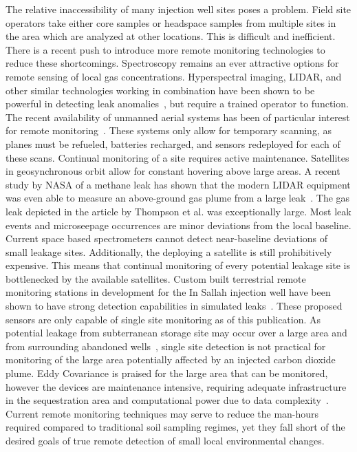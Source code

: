 \documentclass[numbook, envcountsect, envcountsame, envcountreset, runningheads, twocolumn]{svjour3}
\begin{document}
			The relative inaccessibility of many injection well sites poses a problem.  Field site operators take either core samples or headspace samples from multiple sites in the area which are analyzed at other locations. This is difficult and inefficient.  There is a recent push to introduce more remote monitoring technologies to reduce these shortcomings.  Spectroscopy remains an ever attractive options for remote sensing of local gas concentrations.  Hyperspectral imaging, LIDAR, and other similar technologies working in combination have been shown to be powerful in detecting leak anomalies~\cite{bateson_application_2008, male_using_2009}, but require a trained operator to function.  The recent availability of unmanned aerial systems has been of particular interest for remote monitoring~\cite{salami_uav_2014}.  These systems only allow for temporary scanning, as planes must be refueled, batteries recharged, and sensors redeployed for each of these scans.  Continual monitoring of a site requires active maintenance.  Satellites in geosynchronous orbit allow for constant hovering above large areas.  A recent study by NASA of a methane leak has shown that the modern LIDAR equipment was even able to measure an above-ground gas plume from a large leak~\cite{thompson_space-based_2016}.  The gas leak depicted in the article by Thompson et al. was exceptionally large.  Most leak events and microseepage occurrences are minor deviations from the local baseline.  Current space based spectrometers cannot detect near-baseline deviations of small leakage sites.  Additionally, the deploying a satellite is still prohibitively expensive.  This means that continual monitoring of every potential leakage site is bottlenecked by the available satellites.  Custom built terrestrial remote monitoring stations in development for the In Sallah injection well have been shown to have strong detection capabilities in simulated leaks~\cite{barr_laser-based_2011,humphries_testing_2008}.  These proposed sensors are only capable of single site monitoring as of this publication.  As potential leakage from subterranean storage site may occur over a large area and from surrounding abandoned wells~\cite{nordbotten_model_2009,nordbotten_semianalytical_2005}, single site detection is not practical for monitoring of the large area potentially affected by an injected carbon dioxide plume.  Eddy Covariance is praised for the large area that can be monitored, however the devices are maintenance intensive, requiring adequate infrastructure in the sequestration area and computational power due to data complexity~\cite{klusman_comparison_2011}.  Current remote monitoring techniques may serve to reduce the man-hours required compared to traditional soil sampling regimes, yet they fall short of the desired goals of true remote detection of small local environmental changes.
			
\end{document}
